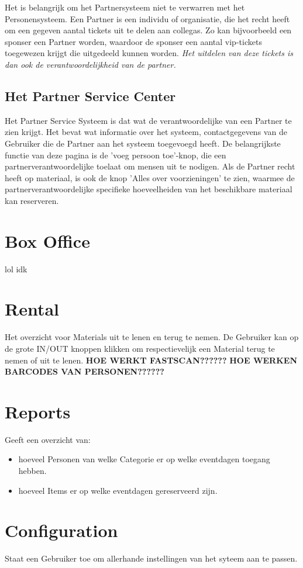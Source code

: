 \documentclass[]{memoir}
\begin{document}
Het is belangrijk om het Partnersysteem niet te verwarren met het Personensysteem. Een Partner is een individu of organisatie, die het recht heeft om een gegeven aantal tickets uit te delen aan collegas. Zo kan bijvoorbeeld een sponser een Partner worden, waardoor de sponser een aantal vip-tickets toegewezen krijgt die uitgedeeld kunnen worden. \textsl{Het uitdelen van deze tickets is dan ook de verantwoordelijkheid van de partner.}

\subsection{Het Partner Service Center}
Het Partner Service Systeem is dat wat de verantwoordelijke van een Partner te zien krijgt. Het bevat wat informatie over het systeem, contactgegevens van de Gebruiker die de Partner aan het systeem toegevoegd heeft.
De belangrijkste functie van deze pagina is de 'voeg persoon toe'-knop, die een partnerverantwoordelijke toelaat om mensen uit te nodigen. Als de Partner recht heeft op materiaal, is ook de knop 'Alles over voorzieningen' te zien, waarmee de partnerverantwoordelijke specifieke hoeveelheiden van het beschikbare materiaal kan reserveren.

\section{Box Office}
lol idk

\section{Rental}
Het overzicht voor Materials uit te lenen en terug te nemen. De Gebruiker kan op de grote IN/OUT knoppen klikken om respectievelijk een Material terug te nemen of uit te lenen.
\textbf{HOE WERKT FASTSCAN??????}
\textbf{HOE WERKEN BARCODES VAN PERSONEN??????}

\section{Reports}
Geeft een overzicht van:
\begin{itemize}
	\item  hoeveel Personen van welke Categorie er op welke eventdagen toegang hebben.
	\item  hoeveel Items er op welke eventdagen gereserveerd zijn.
\end{itemize}

\section{Configuration}
Staat een Gebruiker toe om allerhande instellingen van het syteem aan te passen.
\end{document}
